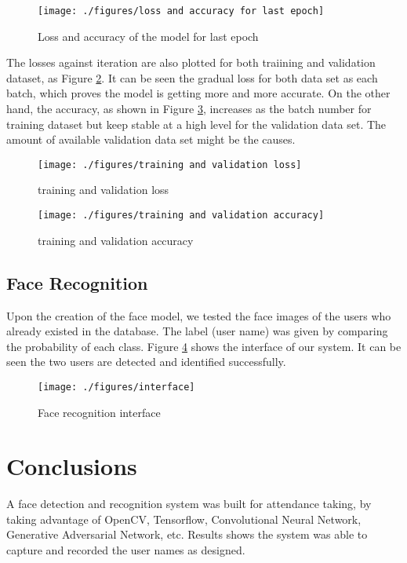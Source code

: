 \documentclass[conference]{IEEEtran}
\begin{document}
\begin{figure}[H]
\centerline{\texttt{[image: ./figures/loss and accuracy for last epoch]}}
\caption{Loss and accuracy of the model for last epoch}
\label{fig6}
\end{figure}

The losses against iteration are also plotted for both traiining and validation dataset, as Figure \ref{fig7}. It can be seen the gradual loss for both data set as each batch, which proves the model is getting more and more accurate. On the other hand, the accuracy, as shown in Figure \ref{fig8}, increases as the batch number for training dataset but keep stable at a high level for the validation data set. The amount of available validation data set might be the causes. 

\begin{figure}[H]
\centerline{\texttt{[image: ./figures/training and validation loss]}}
\caption{training and validation loss}
\label{fig7}
\end{figure}


\begin{figure}[h]
\centerline{\texttt{[image: ./figures/training and validation accuracy]}}
\caption{training and validation accuracy}
\label{fig8}
\end{figure}

\subsection{Face Recognition}
Upon the creation of the face model, we tested the face images of the users who already existed in the database. The label (user name) was given by comparing the probability of each class. Figure \ref{fig9} shows the interface of our system. It can be seen the two users are detected and identified successfully. 

\begin{figure}[H]
\centerline{\texttt{[image: ./figures/interface]}}
\caption{Face recognition interface}
\label{fig9}
\end{figure}


\section{Conclusions}
A face detection and recognition system was built for attendance taking, by taking advantage of OpenCV, Tensorflow, Convolutional Neural Network, Generative Adversarial Network, etc.  Results shows the system was able to capture and recorded the user names as designed. 
\end{document}
